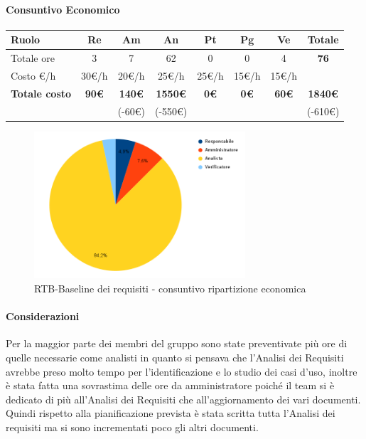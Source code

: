 \paragraph{Consuntivo Economico}
\begin{center}
	\renewcommand{\arraystretch}{1.8}
	\begin{tabular}{ |m{6em}|c|c|c|c|c|c|c| }
	\hline
	\textbf{Ruolo} & \textbf{Re} & \textbf{Am} &  \textbf{An} &  \textbf{Pt} &  \textbf{Pg} &  \textbf{Ve} &  \textbf{Totale}\\
    \hline
    Totale ore & 3 & 7 & 62 & 0 & 0 & 4 & \textbf{76}\\
    \hline
    Costo \euro/h & 30\euro/h & 20\euro/h & 25\euro/h & 25\euro/h & 15\euro/h & 15\euro/h & \\
    \hline
    \textbf{Totale costo} & \textbf{90\euro} & \textbf{140\euro} &  \textbf{1550\euro} & \textbf{0\euro} &  \textbf{0\euro} &  \textbf{60\euro} &  \textbf{1840\euro} \\
    &  & (-60\euro) & (-550\euro) &  &  &  & (-610\euro) \\
    \hline
	\end{tabular}

    \begin{figure}[H]
        \centering\includegraphics[width=0.7\textwidth, height=0.7\textheight, keepaspectratio]{images/consuntivo/RTB-requisiti-costo.png}
        \caption{RTB-Baseline dei requisiti - consuntivo ripartizione economica}
    \end{figure}
\end{center}

\paragraph{Considerazioni} \hfill \break
Per la maggior parte dei membri del gruppo sono state preventivate più ore di quelle necessarie come analisti in quanto 
si pensava che l'Analisi dei Requisiti avrebbe preso molto tempo per l'identificazione e lo studio dei casi d'uso, inoltre è stata
fatta una sovrastima delle ore da amministratore poiché il team si è dedicato di più all'Analisi dei Requisiti 
che all'aggiornamento dei vari documenti.
Quindi rispetto alla pianificazione prevista è stata scritta tutta l'Analisi dei requisiti ma si sono incrementati poco gli altri documenti.

